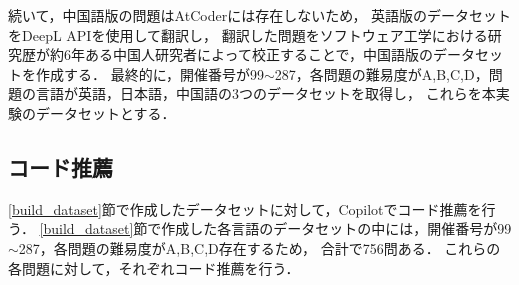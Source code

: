     続いて，中国語版の問題はAtCoderには存在しないため，
    英語版のデータセットをDeepL APIを使用して翻訳し，
    翻訳した問題をソフトウェア工学における研究歴が約6年ある中国人研究者によって校正することで，中国語版のデータセットを作成する．
    最終的に，開催番号が99${\sim}$287，各問題の難易度がA,B,C,D，問題の言語が英語，日本語，中国語の3つのデータセットを取得し，
    これらを本実験のデータセットとする．

  \subsection{コード推薦\label{recommend_program}}
    \ref{build_dataset}節で作成したデータセットに対して，Copilotでコード推薦を行う．
    \ref{build_dataset}節で作成した各言語のデータセットの中には，開催番号が99${\sim}$287，各問題の難易度がA,B,C,D存在するため，
    合計で756問ある．
    これらの各問題に対して，それぞれコード推薦を行う．
    
